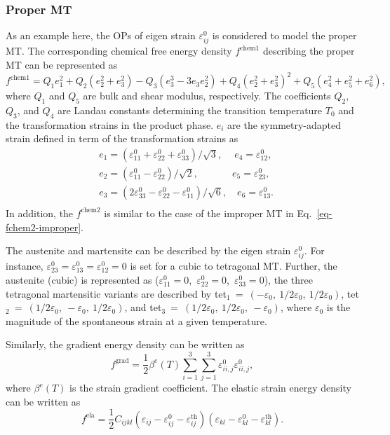 \documentclass[reprint,3p,sort&compress,times,onecolumn]{elsarticle}
\begin{document}
\subsubsection{Proper MT}

As an example here, the OPs of eigen strain $\varepsilon_{ij}^{0}$ is considered to model the proper MT.
The corresponding chemical free energy density $f^{\text{chem1}}$ describing the proper MT can be represented as~\cite{Zhang2005Phase}
\begin{equation}
f^{\text{chem1}}= Q_1e_1^2+Q_2(e_2^2+e_3^2)-Q_3(e_3^3-3e_3e_2^2)+Q_4(e_2^2 + e_3^2)^2+Q_5(e_4^2+e_5^2+e_6^2), \label{eq-chem-eps}
\end{equation}
where $Q_1$ and $Q_5$ are bulk and shear modulus, respectively. The coefficients $Q_2$, $Q_3$, and $Q_4$ are Landau constants determining the transition temperature $T_0$ and the transformation strains in the product phase.
$e_i$ are the symmetry-adapted strain defined in term of the transformation strains as
\begin{equation}
\begin{split}
& e_1=(\varepsilon_{11}^0+\varepsilon_{22}^0+\varepsilon_{33}^0)/\sqrt{3},   \quad ~ e_4=\varepsilon_{12}^0, \\
& e_2=(\varepsilon_{11}^0-\varepsilon_{22}^0)/\sqrt{2},   \quad\quad\quad~~ e_5=\varepsilon_{23}^0, \\
& e_3=(2\varepsilon_{33}^0-\varepsilon_{22}^0-\varepsilon_{11}^0)/\sqrt{6},   \quad e_6=\varepsilon_{13}^0. \\
\end{split}
\end{equation}
In addition, the $f^{\text{chem2}}$ is similar to the case of the improper MT in Eq.~\ref{eq-fchem2-improper}.

The austenite and martensite can be described by the eigen strain $\varepsilon_{ij}^0$. For instance, $\varepsilon_{23}^0=\varepsilon_{13}^0=\varepsilon_{12}^0=0$ is set for a cubic to tetragonal MT. Further, the austenite (cubic) is represented as ($\varepsilon_{11}^0=0$,~$\varepsilon_{22}^0=0$,~$\varepsilon_{33}^0=0$), the three tetragonal martensitic variants are described by tet$_1$~=~$(-\varepsilon_0,~1/2\varepsilon_0,~1/2\varepsilon_0)$, tet$_2$~=~$(1/2\varepsilon_0,~-\varepsilon_0,~1/2\varepsilon_0)$, and tet$_3$~=~$(1/2\varepsilon_0,~1/2\varepsilon_0,~-\varepsilon_0)$, where $\varepsilon_0$ is the magnitude of the spontaneous strain at a given temperature.

Similarly, the gradient energy density can be written as
\begin{equation}
f^{\text{grad}} = \frac{1}{2} \beta^e(T) \sum_{i=1}^3\sum_{j=1}^3\varepsilon_{ii,j}^0\varepsilon_{ii,j}^0,
\end{equation}
where $\beta^e(T)$ is the strain gradient coefficient. The elastic strain energy density can be written as
\begin{equation}
f^{\text{ela}} = \frac{1}{2} C_{ijkl}(\varepsilon_{ij}-\varepsilon_{ij}^0-\varepsilon_{ij}^{\text{th}})(\varepsilon_{kl}-\varepsilon_{kl}^0-\varepsilon_{kl}^{\text{th}}).
\end{equation}
\end{document}
